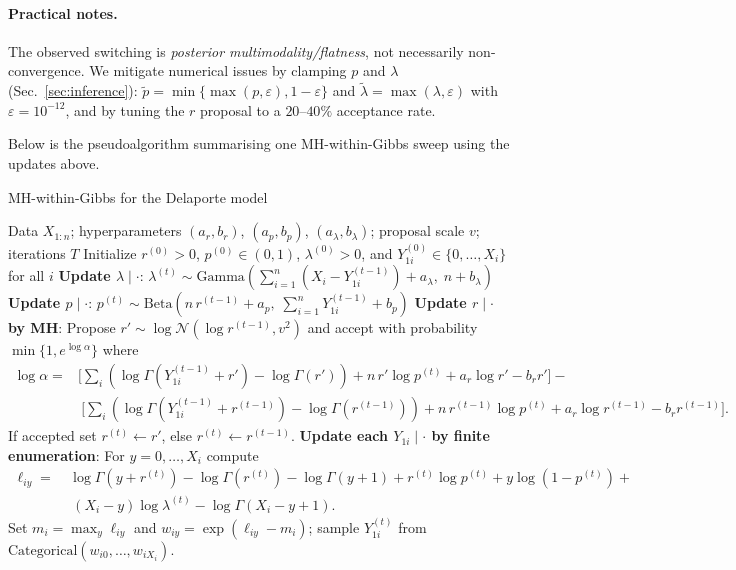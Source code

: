 \documentclass[11pt,a4paper]{article}
\theoremstyle{definition}
\theoremstyle{remark}
\begin{document}
\paragraph{Practical notes.}
The observed switching is \emph{posterior multimodality/flatness}, not necessarily non-convergence.
We mitigate numerical issues by clamping $p$ and $\lambda$ (Sec.~\ref{sec:inference}):
$\tilde p=\min\{\max(p,\varepsilon),1-\varepsilon\}$ and $\tilde\lambda=\max(\lambda,\varepsilon)$ with $\varepsilon=10^{-12}$,
and by tuning the $r$ proposal to a $20$--$40\%$ acceptance rate.

Below is the pseudoalgorithm summarising one MH-within-Gibbs sweep using the updates above.


\begin{algorithm}[H]
    \caption{MH-within-Gibbs for the Delaporte model}\label{alg:delaporte-mhwg}
    \begin{algorithmic}[1]
    \Require Data $X_{1:n}$; hyperparameters $(a_r,b_r)$, $(a_p,b_p)$, $(a_\lambda,b_\lambda)$; proposal scale $v$; iterations $T$
    \State Initialize $r^{(0)} > 0$, $p^{(0)} \in (0,1)$, $\lambda^{(0)} > 0$, and $Y_{1i}^{(0)} \in \{0,\dots,X_i\}$ for all $i$
      \State \textbf{Update $\lambda \mid \cdot$}:
      $\displaystyle \lambda^{(t)} \sim \mathrm{Gamma}\!\left(\sum_{i=1}^n (X_i - Y_{1i}^{(t-1)}) + a_\lambda,\; n + b_\lambda\right)$
      \State \textbf{Update $p \mid \cdot$}:
      $\displaystyle p^{(t)} \sim \mathrm{Beta}\!\left(n\,r^{(t-1)} + a_p,\; \sum_{i=1}^n Y_{1i}^{(t-1)} + b_p\right)$
      \State \textbf{Update $r \mid \cdot$ by MH}:
        Propose $r' \sim \log\mathcal N(\log r^{(t-1)}, v^2)$ and accept with probability $\min\{1, e^{\log\alpha}\}$ where
        \begin{align*}
            \log \alpha
        = &
        \Big[\!\sum_i (\log\Gamma(Y_{1i}^{(t-1)}\!+\!r') - \log\Gamma(r')) + n\,r'\log p^{(t)} + a_r \log r' - b_r r'\Big] -\\  & \ \Big[\!\sum_i (\log\Gamma(Y_{1i}^{(t-1)}\!+\!r^{(t-1)}) - \log\Gamma(r^{(t-1)})) + n\,r^{(t-1)}\log p^{(t)} + a_r \log r^{(t-1)} - b_r r^{(t-1)}\Big].
        \end{align*}
        If accepted set $r^{(t)}\gets r'$, else $r^{(t)}\gets r^{(t-1)}$.
      \State \textbf{Update each $Y_{1i} \mid \cdot$ by finite enumeration}:
        For $y=0,\dots,X_i$ compute
        \begin{align*}
            \ell_{iy}
          = & \ \log\Gamma(y+r^{(t)}) - \log\Gamma(r^{(t)}) - \log\Gamma(y+1)
            + r^{(t)}\log p^{(t)} + y\log(1-p^{(t)}) + \\
            & \ \ (X_i - y)\log \lambda^{(t)} - \log\Gamma(X_i - y + 1).
        \end{align*}
        Set $m_i=\max_y \ell_{iy}$ and $w_{iy}=\exp(\ell_{iy}-m_i)$; sample $Y_{1i}^{(t)}$ from $\mathrm{Categorical}(w_{i0},\dots,w_{iX_i})$.
\EndFor
\end{algorithmic}
 \end{algorithm}

 
    
    
    
    
\end{document}
